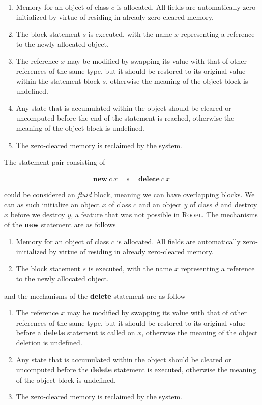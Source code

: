 \begin{enumerate}
\item Memory for an object of class $c$ is allocated. All fields are automatically zero-initialized by virtue of residing in already zero-cleared memory.
\item The block statement $s$ is executed, with the name $x$ representing a reference to the newly allocated object.
\item The reference $x$ may be modified by swapping its value with that of other references of the same type, but it should be restored to its original value within the statement block $s$, otherwise the meaning of the object block is undefined.
\item Any state that is accumulated within the object should be cleared or uncomputed before the end of the statement is reached, otherwise the meaning of the object block is undefined.
\item The zero-cleared memory is reclaimed by the system.
\end{enumerate}

The statement pair consisting of

\begin{align*}
\textbf{new}\ c\ x\ \quad s\ \quad \textbf{delete}\ c\ x\
\end{align*}

could be considered an \textit{fluid} block, meaning we can have overlapping blocks. We can as such initialize an object $x$ of class $c$ and an object $y$ of class $d$ and destroy $x$ before we destroy $y$, a feature that was not possible in \textsc{Roopl}. The mechanisms of the \textbf{new} statement are as follows

\begin{enumerate}
    \item Memory for an object of class $c$ is allocated. All fields are automatically zero-initialized by virtue of residing in already zero-cleared memory.
    \item The block statement $s$ is executed, with the name $x$ representing a reference to the newly allocated object.
\end{enumerate}

and the mechanisms of the \textbf{delete} statement are as follow

\begin{enumerate}
    \item The reference $x$ may be modified by swapping its value with that of other references of the same type, but it should be restored to its original value before a \textbf{delete} statement is called on $x$, otherwise the meaning of the object deletion is undefined.
    \item Any state that is accumulated within the object should be cleared or uncomputed before the \textbf{delete} statement is executed, otherwise the meaning of the object block is undefined.
    \item The zero-cleared memory is reclaimed by the system.
\end{enumerate}

